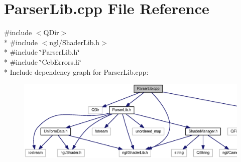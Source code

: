 \section{Parser\-Lib.\-cpp File Reference}
\label{_parser_lib_8cpp}
{\ttfamily \#include $<$Q\-Dir$>$}\\*
{\ttfamily \#include $<$ngl/\-Shader\-Lib.\-h$>$}\\*
{\ttfamily \#include \char`\"{}Parser\-Lib.\-h\char`\"{}}\\*
{\ttfamily \#include \char`\"{}Ceb\-Errors.\-h\char`\"{}}\\*
Include dependency graph for Parser\-Lib.\-cpp\-:
\nopagebreak
\begin{figure}[H]
\begin{center}
\leavevmode
\includegraphics[width=350pt]{_parser_lib_8cpp__incl}
\end{center}
\end{figure}
